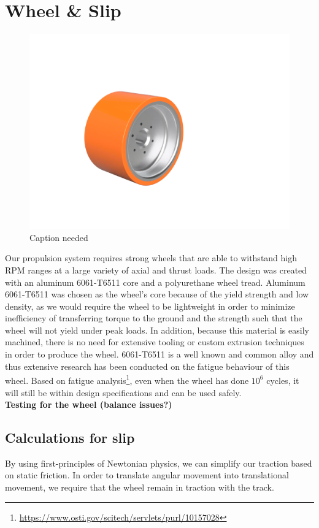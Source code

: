 \documentclass[main.tex]{subfiles}
\begin{document}
    \section{Wheel \& Slip}
    
    \begin{figure}[H]
        \centering
        \includegraphics[width=\linewidth]{images/fig19}
        \caption{Caption needed}
    \end{figure}
    Our propulsion system requires strong wheels that are able to withstand high RPM ranges at a large variety of axial and thrust loads. The design was created with an aluminum 6061-T6511 core and a polyurethane wheel tread. Aluminum 6061-T6511 was chosen as the wheel’s core because of the yield strength and low density, as we would require the wheel to be lightweight in order to minimize inefficiency of transferring torque to the ground and the strength such that the wheel will not yield under peak loads. In addition, because this material is easily machined, there is no need for extensive tooling or custom extrusion techniques in order to produce the wheel. 6061-T6511 is a well known and common alloy and thus extensive research has been conducted on the fatigue behaviour of this wheel. Based on fatigue analysis\footnote{\url{https://www.osti.gov/scitech/servlets/purl/10157028}}, even when the wheel has done $10^6$ cycles, it will still be within design specifications and can be used safely.\\

    \textbf{Testing for the wheel (balance issues?)}

    \subsection{Calculations for slip}
    By using first-principles of Newtonian physics, we can simplify our traction based on static friction. In order to translate angular movement into translational movement, we require that the wheel remain in traction with the track.\\
\end{document}
